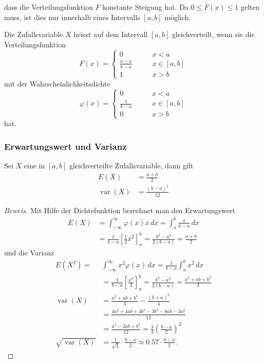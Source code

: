 dass die Verteilungsfunktion $F$ konstante Steigung hat.
Da $0\le F(x)\le 1$
gelten muss, ist dies nur innerhalb eines Intervalls $[a,b]$ möglich.
\begin{definition}Die Zufallsvariable $X$ heisst auf dem Intervall
$[a,b]$ gleichverteilt, wenn sie die Verteilungsfunktion
\[
F(x)=\begin{cases}
0&\qquad x< a\\
\displaystyle \frac{x-a}{b-a}&\qquad x\in[a,b]\\
1&\qquad x> b
\end{cases}
\]
mit der Wahrscheinlichkeitsdichte
\[
\varphi(x)=\begin{cases}
0&\qquad x< a\\
\displaystyle \frac1{b-a}&\qquad x\in[a,b]\\
0&\qquad x> b
\end{cases}
\]
hat.
\end{definition}

\subsubsection{Erwartungswert und Varianz}
\begin{satz}Sei $X$ eine in $[a,b]$ gleichverteilte Zufallsvariable,
dann gilt
\begin{align*}
E(X)&=\frac{a+b}2\\
\operatorname{var}(X)&=\frac{(b-a)^2}{12}
\end{align*}
\end{satz}
\begin{proof}[Beweis]
Mit Hilfe der Dichtefunktion berechnet man den Erwartungswert
\begin{align*}
E(X)&=\int_{-\infty}^\infty \varphi(x)x\,dx=\int_a^b\frac{x}{b-a}\,dx\\
&=\frac1{b-a}\left[\frac12x^2\right]_a^b=\frac{b^2-a^2}{2(b-a)}=\frac{a+b}2
\end{align*}
und die Varianz
\begin{align*}
E(X^2)=&\int_{-\infty}^\infty x^2\varphi(x)\,dx=\frac1{b-a}\int_a^bx^2\,dx\\
&=\frac1{b-a}\left[\frac{x^3}3\right]_a^b=\frac{b^3-a^3}{3(b-a)}=\frac{a^2+ab+b^2}3\\
\operatorname{var}(X)&=\frac{a^2+ab+b^2}3-\frac{(b+a)^2}4\\
&=\frac{4a^2+4ab+4b^2-3b^2-6ab-3a^2}{12}\\
&=\frac{a^2-2ab+b^2}{12}=\frac13\left(\frac{b-a}2\right)^2\\
\sqrt{\operatorname{var}(X)}&=\frac1{\sqrt{3}}\cdot\frac{b-a}2\simeq 0.57\cdot\frac{b-a}2.
\end{align*}

\end{proof}

